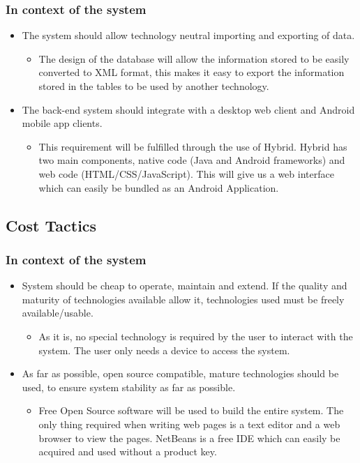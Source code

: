 \documentclass[a4paper,10pt]{article}
\begin{document}
\subsubsection{In context of the system} 
		\begin{itemize}
			\item The system should allow technology neutral importing and exporting of data.
				\begin{itemize}
					\item The design of the database will allow the information stored to be easily converted to XML format, this makes it easy to export the information stored in the tables to be used by another technology. 
				\end{itemize}
			\item The back-end system should integrate with a desktop web client and Android mobile app clients.
				\begin{itemize}
					\item This requirement will be fulfilled through the use of Hybrid. Hybrid has two main components, native code (Java and Android frameworks) and web code (HTML/CSS/JavaScript). This will give us a web interface which can easily be bundled as an Android Application. 
				\end{itemize}
		\end{itemize}


\subsection{Cost Tactics} 
	\subsubsection{In context of the system}
		\begin{itemize}
			\item System should be cheap to operate, maintain and extend. If the quality and maturity of technologies available allow it, technologies used must be freely available/usable.
				\begin{itemize}
					\item As it is, no special technology is required by the user to interact with the system. The user only needs a device to access the system. 
				\end{itemize}
			\item As far as possible, open source compatible, mature technologies should be used, to ensure system stability as far as possible.
				\begin{itemize}
					\item Free Open Source software will be used to build the entire system. The only thing required when writing web pages is a text editor and a web browser to view the pages. NetBeans is a free IDE which can easily be acquired and used without a product key. 
				\end{itemize}
		\end{itemize}
\end{document}
